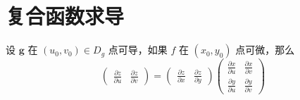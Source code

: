 \documentclass{ctexbook}
\begin{document}
\section{复合函数求导}

\begin{definition}[多元复合函数链式规则]
    设 $\boldsymbol{g}$ 在 $(u_0,v_0)\in D_g$ 点可导，如果 $f$ 在 $(x_0,y_0)$ 点可微，那么
    \begin{equation}
        \begin{pmatrix}
            \frac{\partial z}{\partial u} & \frac{\partial z}{\partial v}
        \end{pmatrix} = \begin{pmatrix}
            \frac{\partial z}{\partial x} & \frac{\partial z}{\partial y}
        \end{pmatrix}
        \begin{pmatrix}
            \frac{\partial x}{\partial u} & \frac{\partial x}{\partial v} \\
            \frac{\partial y}{\partial u} & \frac{\partial y}{\partial v}
        \end{pmatrix}
    \end{equation}
\end{definition}
\end{document}
